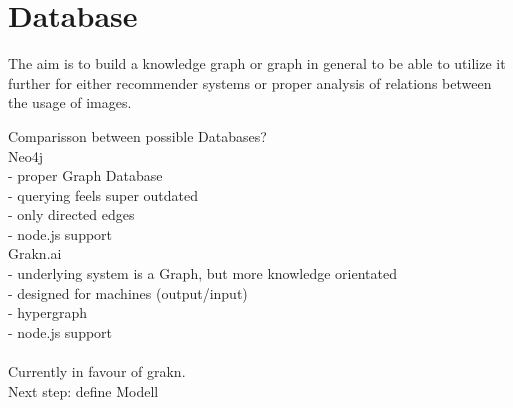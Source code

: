 \section{Database}
The aim is to build a knowledge graph or graph in general to be able to utilize it further for either recommender systems or proper analysis of relations between the usage of images.

Comparisson between possible Databases?\\

Neo4j\\
- proper Graph Database\\
- querying feels super outdated\\
- only directed edges\\
- node.js support\\

Grakn.ai\\
- underlying system is a Graph, but more knowledge orientated\\
- designed for machines (output/input)\\
- hypergraph\\
- node.js support\\
\\
Currently in favour of grakn.\\
Next step: define Modell\\